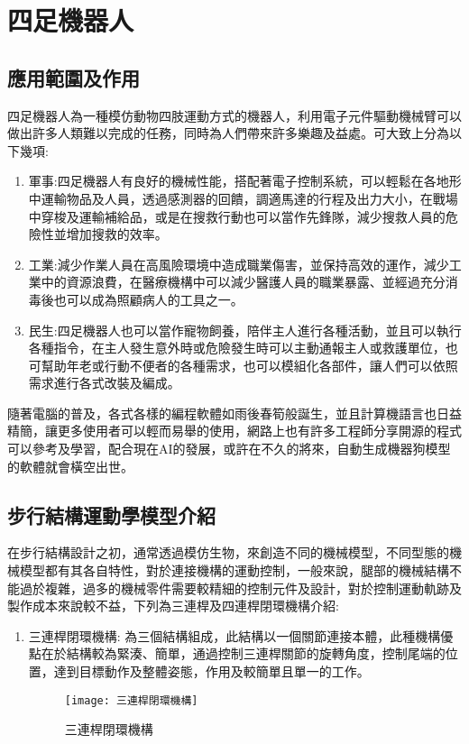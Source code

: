\chapter{四足機器人}
\section{應用範圍及作用}
四足機器人為一種模仿動物四肢運動方式的機器人，利用電子元件驅動機械臂可以做出許多人類難以完成的任務，同時為人們帶來許多樂趣及益處。可大致上分為以下幾項:\
\begin{enumerate}
\item 軍事:四足機器人有良好的機械性能，搭配著電子控制系統，可以輕鬆在各地形中運輸物品及人員，透過感測器的回饋，調適馬達的行程及出力大小，在戰場中穿梭及運輸補給品，或是在搜救行動也可以當作先鋒隊，減少搜救人員的危險性並增加搜救的效率。\
\item 工業:減少作業人員在高風險環境中造成職業傷害，並保持高效的運作，減少工業中的資源浪費，在醫療機構中可以減少醫護人員的職業暴露、並經過充分消毒後也可以成為照顧病人的工具之一。\
\item 民生:四足機器人也可以當作寵物飼養，陪伴主人進行各種活動，並且可以執行各種指令，在主人發生意外時或危險發生時可以主動通報主人或救護單位，也可幫助年老或行動不便者的各種需求，也可以模組化各部件，讓人們可以依照需求進行各式改裝及編成。\
\end{enumerate}
隨著電腦的普及，各式各樣的編程軟體如雨後春筍般誕生，並且計算機語言也日益精簡，讓更多使用者可以輕而易舉的使用，網路上也有許多工程師分享開源的程式可以參考及學習，配合現在AI的發展，或許在不久的將來，自動生成機器狗模型的軟體就會橫空出世。\\[6pt]
\newpage
\section{步行結構運動學模型介紹}

在步行結構設計之初，通常透過模仿生物，來創造不同的機械模型，不同型態的機械模型都有其各自特性，對於連接機構的運動控制，一般來說，腿部的機械結構不能過於複雜，過多的機械零件需要較精細的控制元件及設計，對於控制運動軌跡及製作成本來說較不益，下列為三連桿及四連桿閉環機構介紹:\
\begin{enumerate}
\item 三連桿閉環機構:
為三個結構組成，此結構以一個關節連接本體，此種機構優點在於結構較為緊湊、簡單，通過控制三連桿關節的旋轉角度，控制尾端的位置，達到目標動作及整體姿態，作用及較簡單且單一的工作。\

\begin{figure}[hbt!]
\begin{center}
\texttt{[image: 三連桿閉環機構]}
\caption{\Large 三連桿閉環機構}\label{三連桿閉環機構}
\end{center}
\end{figure}
\end{enumerate}
\newpage

